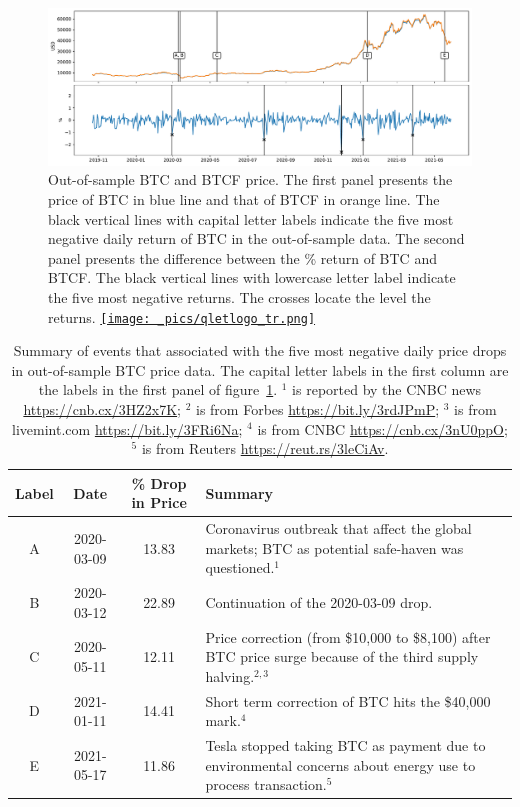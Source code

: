 \begin{figure}[!t]
\includegraphics[width=\textwidth]{_pics/BTC_price.pdf}
  \caption{Out-of-sample BTC and BTCF price. The first panel presents the price of BTC in blue line and that of BTCF in orange line.
  The black vertical lines with capital letter labels indicate the five most negative daily return of BTC in the out-of-sample data.
  The second panel presents the difference between the \% return of BTC and BTCF.
  The black vertical lines with lowercase letter label indicate the five most negative returns.
  The crosses locate the level the returns.
  \href{http://www.quantlet.com/}{\texttt{[image: \_pics/qletlogo\_tr.png]}} }
\label{fig:BTC_price}
\end{figure}

\begin{table}[!]
    \centering
      \begin{tabularx}{.8\textwidth}{cccX}
        \toprule
        Label &   Date & \% Drop in Price &  Summary\\
        \midrule
        A &  2020-03-09 & 13.83 &  Coronavirus outbreak that affect the global markets; BTC as potential safe-haven was questioned.$^1$\\
        B &  2020-03-12 & 22.89 &  Continuation of the 2020-03-09 drop.  \\
        C &  2020-05-11 & 12.11 &  Price correction (from \$10,000 to \$8,100) after BTC price surge because of the third supply halving.$^{2,3}$ \\
        D &  2021-01-11 & 14.41 &  Short term correction of BTC hits the \$40,000 mark.$^4$\\
        E &  2021-05-17 & 11.86 &  Tesla stopped taking BTC as payment due to environmental concerns about energy use to process transaction.$^5$\\
        \bottomrule
      \end{tabularx}
        \caption{Summary of events that associated with the five most negative daily price drops in out-of-sample BTC price data.
        The capital letter labels in the first column are the labels in the first panel of figure~\ref{fig:BTC_price}.
        $^1$ is reported by the CNBC news \url{https://cnb.cx/3HZ2x7K}; $^2$ is from Forbes \url{https://bit.ly/3rdJPmP};
        $^3$ is from livemint.com \url{https://bit.ly/3FRi6Na};
        $^4$ is from CNBC \url{https://cnb.cx/3nU0ppO};
        $^5$ is from Reuters \url{https://reut.rs/3leCiAv}.
        }
        \label{tab:BTC_5min}
  \end{table}

